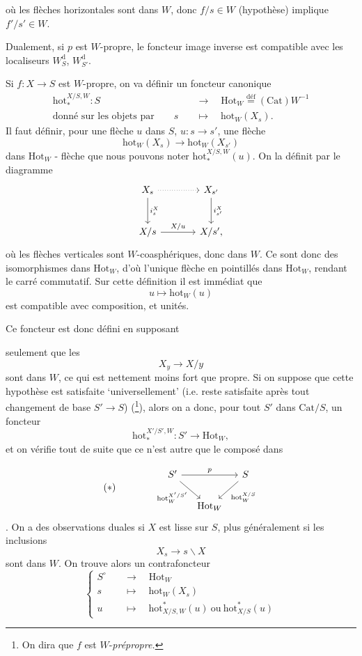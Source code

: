 \documentclass[11pt]{article}
\newcommand{\printedpage}[1]{\marginpar{\footnotesize p.~#1}}
\newcommand{\msp}[1]{\marginpar{\footnotesize [#1]}}
\newcommand{\Hot}{\mathrm{Hot}}
\newcommand{\Cat}{\mathrm{Cat}}
\newcommand{\hot}{\mathrm{hot}}
\begin{document}
\printedpage{26}
où les flèches horizontales sont dans $W$, donc $f/s\in W$ (hypothèse) implique $f'/s'\in W$.

\leavevmode\msp{page 33}Dualement, si $p$ est $W$-propre, le foncteur image inverse est compatible avec les localiseurs $W^{\mathrm{d}}_S$, $W^{\mathrm{d}}_{S'}$.

Si $f : X\longrightarrow S$ est $W$-propre, on va définir un foncteur canonique
\[
\begin{aligned}
\hot_*^{X/S,W} : S &\quad\longrightarrow\quad \Hot_W\overset{\text{déf}}{=}(\Cat)W^{-1}\\
\text{donné sur les objets par}\qquad s &\quad\longmapsto\quad \hot_W(X_s).
\end{aligned}
\]
Il faut définir, pour une flèche $u$ dans $S$, $u : s\longrightarrow s'$, une flèche
\[
\hot_W(X_s)\longrightarrow\hot_W(X_{s'})
\]
dans $\Hot_W$ - flèche que nous pouvons noter $\hot_*^{X/S,W}(u)$. On la définit par le diagramme
\[
\begin{tikzcd}[row sep=large, column sep=large]
X_s \arrow[r, dotted] \arrow[d, "i_s^X"] & X_{s'} \arrow[d, "i_{s'}^X"] \\
X/s \arrow[r, "X/u"] & X/s',
\end{tikzcd}
\]
où les flèches verticales sont $W$-coasphériques, donc dans $W$. Ce sont donc des isomorphismes dans $\Hot_W$, d'où l'unique flèche en pointillés dans $\Hot_W$, rendant le carré commutatif. Sur cette définition il est immédiat que
\[
u\longmapsto\hot_W(u)
\]
est compatible avec composition, et unités.

Ce foncteur est donc défini en supposant

\leavevmode\msp{page 34}seulement que les
\[
X_y\longrightarrow X/y
\]
sont dans $W$, ce qui est nettement moins fort que propre. Si on suppose que cette hypothèse est satisfaite `universellement' (i.e. reste satisfaite après tout changement de base $S'\longrightarrow S$) (\footnote[45]{On dira que $f$ est $W$-\textit{prépropre.}}), alors on a donc, pour tout $S'$ dans $\Cat/S$, un foncteur
\[
\hot_*^{X'/S',W} : S'\longrightarrow\Hot_W,
\]
et on vérifie tout de suite que ce n'est autre que le composé dans

\printedpage{27}
\[
(*)\qquad\qquad
\begin{tikzcd}[column sep=small]
S' \arrow[rr, "p"] \arrow[dr, "\hot_W^{X'/S'}"'] & & S \arrow[dl, "\hot_W^{X/S}"] \\
& \Hot_W &
\end{tikzcd}
\]
. On a des observations duales si $X$ est lisse sur $S$, plus généralement si les inclusions
\[
X_s\longrightarrow s\backslash X
\]
sont dans $W$. On trouve alors un contrafoncteur
\[
\left\{
\begin{aligned}
S^\circ &\quad\longrightarrow\quad \Hot_W\\
s &\quad\longmapsto\quad \hot_W(X_s)\\
u &\quad\longmapsto\quad \hot^*_{X/S,W}(u)\ \text{ou}\ \hot^*_{X/S}(u)
\end{aligned}
\right.
\]
\end{document}
